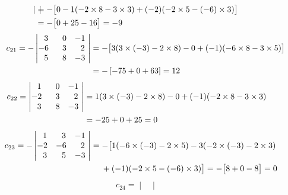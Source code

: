 \documentclass[12pt]{amsart}
\begin{document}
\begin{enumerate}
\begin{enumerate}
\begin{align}
\begin{vmatrix}
				\end{vmatrix}&=-\big[0-1(-2\times8-3\times3)+(-2)(-2\times5-(-6)\times3)\big] \notag \\
				&=-\big[0+25-16\big]=-9 \notag
			\end{align}
			\begin{align}
			\hspace{0.8cm} c_{21}=-
				\begin{vmatrix}
					\text{ } \text{ }3 &\text{ } \text{ }0 &-1 \text{ } \\
					-6 &\text{ } \text{ }3 &\text{ } \text{ }2 \text{ } \\
					\text{ } \text{ }5 &\text{ } \text{ }8 &-3 \text{ } \\
				\end{vmatrix}&=-\big[3(3\times(-3)-2\times8)-0+(-1)(-6\times8-3\times5)\big] \notag \\
				&=-\left[-75+0+63\right]=12 \notag
			\end{align}
			\begin{align}
			c_{22}=
				\begin{vmatrix}
					\text{ } \text{ }1 &\text{ } \text{ }0 &-1 \text{ } \\
					-2 &\text{ } \text{ }3 &\text{ } \text{ }2 \text{ } \\
					\text{ } \text{ }3 &\text{ } \text{ }8 &-3 \text{ } \\
				\end{vmatrix}&=1(3\times(-3)-2\times8)-0+(-1)(-2\times8-3\times3) \notag \\
				&=-25+0+25=0 \notag
			\end{align}
			\begin{align}
			\hspace{0.4cm} c_{23}=-
				\begin{vmatrix}
					\text{ } \text{ }1 &\text{ } \text{ }3 &-1 \text{ } \\
					-2 &-6 &\text{ } \text{ }2 \text{ } \\
					\text{ } \text{ }3 &\text{ } \text{ }5 &-3 \text{ } \\
				\end{vmatrix}&=-\big[1(-6\times(-3)-2\times5)-3(-2\times(-3)-2\times3) \notag \\
				&\hspace{0.45cm}+(-1)(-2\times5-(-6)\times3)\big]=-\big[8+0-8\big]=0 \notag 
			\end{align}
			\begin{align}
			c_{24}=
				\begin{vmatrix}

\end{vmatrix}
\end{align}
\end{enumerate}
\end{enumerate}
\end{document}
